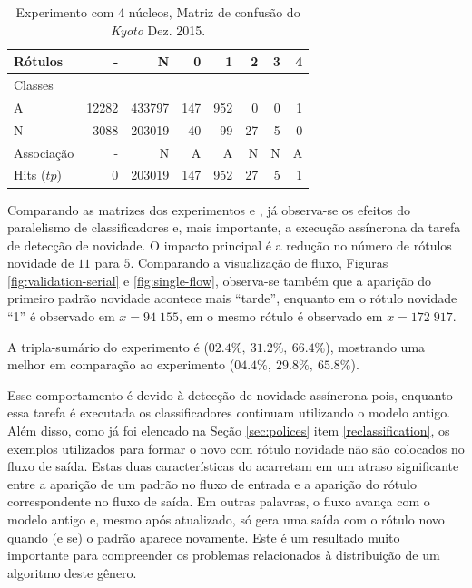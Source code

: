 \begin{table}[hbt]
  \centering
  \caption{Experimento \mfog \single com 4 núcleos, Matriz de confusão do \dataset \emph{Kyoto} Dez. 2015.}
  \label{tab:single-matrix}
  \begin{tabular}{l|r|r|r|r|r|r|r}
    Rótulos &      - &       N &    0 &    1 &   2 &  3 &  4 \\\hline
    Classes  &        &         &      &      &     &    &    \\\hline
    \hline
    A        &  12282 &  433797 &  147 &  952 &   0 &  0 &  1 \\\hline
    N        &   3088 &  203019 &   40 &   99 &  27 &  5 &  0 \\\hline
    \hline
    Associação &      - &       N &    A &    A &   N &  N &  A \\\hline
    Hits ($tp$)     &      0 &  203019 &  147 &  952 &  27 &  5 &  1 
  \end{tabular}
\end{table}

Comparando as matrizes dos experimentos \serial e \single, já observa-se os
efeitos do paralelismo de classificadores e, mais importante, a execução
assíncrona da tarefa de detecção de novidade.
O impacto principal é a redução no número de rótulos novidade de $11$ para $5$.
Comparando a visualização de fluxo, Figuras \ref{fig:validation-serial} e
\ref{fig:single-flow}, observa-se também que a aparição do primeiro padrão
novidade acontece mais ``tarde'', enquanto em \serial o rótulo novidade ``1'' é
observado em $x = 94\;155$, em \single o mesmo rótulo é observado em $x =
172\;917$.

A tripla-sumário do experimento \single é ($02.4\%,\: 31.2\%,\: 66.4\%$),
mostrando uma melhor em comparação ao experimento \serial ($04.4\%,\: 29.8\%,\: 65.8\%$).

Esse comportamento é devido à detecção de novidade assíncrona pois, enquanto
essa tarefa é executada os classificadores continuam utilizando o modelo antigo.
Além disso, como já foi elencado na Seção \ref{sec:polices} item
\ref{reclassification}, os exemplos utilizados para formar o novo \mcluster
com rótulo novidade não são colocados no fluxo de saída.
Estas duas características do \mfog acarretam em um atraso significante entre a
aparição de um padrão no fluxo de entrada e a aparição do rótulo correspondente
no fluxo de saída.
Em outras palavras, o fluxo avança com o modelo antigo e, mesmo após atualizado,
só gera uma saída com o rótulo novo quando (e se) o padrão aparece novamente.
Este é um resultado muito importante para compreender os problemas relacionados
à distribuição de um algoritmo deste gênero.

